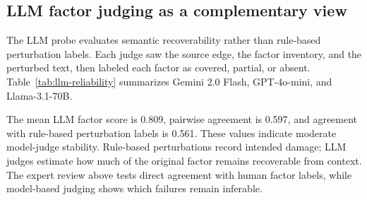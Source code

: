 \subsection{LLM factor judging as a complementary view}
The LLM probe evaluates semantic recoverability rather than rule-based perturbation labels. Each judge saw the source edge, the factor inventory, and the perturbed text, then labeled each factor as covered, partial, or absent. Table~\ref{tab:llm-reliability} summarizes Gemini 2.0 Flash, GPT-4o-mini, and Llama-3.1-70B.



The mean LLM factor score is 0.809, pairwise agreement is 0.597, and agreement with rule-based perturbation labels is 0.561. These values indicate moderate model-judge stability. Rule-based perturbations record intended damage; LLM judges estimate how much of the original factor remains recoverable from context. The expert review above tests direct agreement with human factor labels, while model-based judging shows which failures remain inferable.
